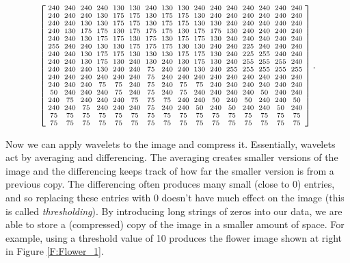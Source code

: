 \begin{equation} \label{eq:flower_image_matrix} 
 \left[\arraycolsep=2.5pt {\scriptsize \begin{array}{cccccccccccccccc} 240&240&240&240&130&130&240&
130&130&240&240&240&240&240&240&240\\240&240&240&130
&175&175&130&175&175&130&240&240&240&240&240&240\\
240&240&130&130&175&175&130&175&175&130&130&240&240&240&240&240
\\240&130&175&175&130&175&175&175&130&175&175&130&
240&240&240&240\\240&240&130&175&175&130&175&130&175
&175&130&240&240&240&240&240\\255&240&240&130&130&
175&175&175&130&130&240&240&225&240&240&240\\240&240
&130&175&175&130&130&130&175&175&130&240&225&255&240&240
\\240&240&130&175&130&240&130&240&130&175&130&240&
255&255&255&240\\240&240&240&130&240&240&75&240&240&
130&240&255&255&255&255&255\\240&240&240&240&240&240
&75&240&240&240&240&240&240&240&240&240\\240&240&240
&75&75&240&75&240&75&75&240&240&240&240&240&240\\50&
240&240&240&75&240&75&240&75&240&240&240&240&50&240&240
\\240&75&240&240&240&75&75&75&240&240&50&240&50&240&
240&50\\240&240&75&240&240&240&75&240&240&50&240&50&
240&240&50&240\\75&75&75&75&75&75&75&75&75&75&75&75&
75&75&75&75\\75&75&75&75&75&75&75&75&75&75&75&75&75&
75&75&75\end {array} }\right].
\end{equation} 

Now we can apply wavelets to the image and compress it. Essentially, wavelets act by averaging and differencing. The averaging creates smaller versions of the image and the differencing keeps track of how far the smaller version is from a previous copy. The differencing often produces many small (close to 0) entries, and so replacing these entries with 0 doesn't have much effect on the image (this is called \emph{thresholding}). By introducing long strings of zeros into our data, we are able to store a (compressed) copy of the image in a smaller amount of space. For example, using a threshold value of 10 produces the flower image shown at right in Figure \ref{F:Flower_1}. 

